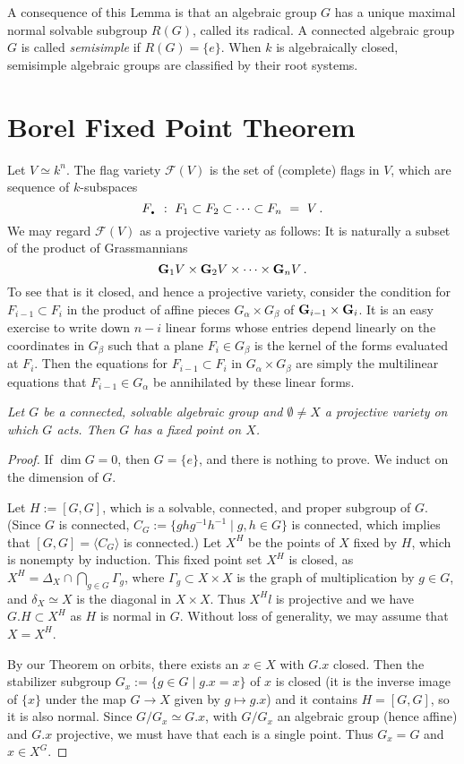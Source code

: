 \documentclass[12pt]{amsart}
\newcommand{\DOT}{{\mbox{\Large\bf .}}}
\newcommand{\G}{{\bf G}}
\begin{document}
A consequence of this Lemma is that an algebraic group $G$ has a unique maximal
normal solvable subgroup $R(G)$, called its radical.
A connected algebraic group $G$ is called {\sl semisimple} if $R(G)=\{e\}$.
When $k$ is algebraically closed, semisimple algebraic groups are classified
by their root systems.



\section{Borel Fixed Point Theorem}


Let $V\simeq k^n$.
The flag variety ${\mathcal F}(V)$ is
the set of 
(complete) flags in $V$, which are sequence of $k$-subspaces
$$
   F_{\DOT}\ :\ F_1\subset F_2\subset\cdots\subset F_n\ =\ V\,.
$$
We may regard ${\mathcal F}(V)$ as a projective variety as follows:
It is naturally a subset of the product of Grassmannians
$$
  {\bf G}_1V\times {\bf G}_2 V\times \cdots\times {\bf G}_nV\,.
$$
To see that is it closed, and hence a projective variety,
consider the condition for $F_{i-1}\subset F_i$ in
the product of affine pieces $G_{\alpha}\times G_\beta$ of 
$\G_{i-1}\times \G_i$.
It is an easy exercise to write down $n-i$ linear forms whose entries depend
linearly on the coordinates in $G_\beta$ such that a plane $F_i\in G_\beta$
is the kernel of the forms evaluated at $F_i$.
Then the equations for $F_{i-1}\subset F_i$ in $G_{\alpha}\times G_\beta$ 
are simply the multilinear equations that $F_{i-1}\in G_\alpha$
be annihilated by these linear forms.
\medskip


{\it 
Let $G$ be a connected, solvable algebraic group and $\emptyset\neq X$ a
projective variety on which $G$ acts.
Then $G$ has a fixed point on $X$.
}\medskip

\begin{proof}
If $\dim G=0$, then $G=\{e\}$, and there is nothing to prove.
We induct on the dimension of $G$.

Let $H:=[G,G]$, which is a solvable, connected, and proper subgroup of $G$.
(Since $G$ is connected, $C_G:=\{ghg^{-1}h^{-1}\mid g,h\in G\}$ is
connected, which 
implies that $[G,G]=\langle C_G \rangle$ is connected.)
Let $X^H$ be the points of $X$ fixed by $H$, which is nonempty by
induction.
This fixed point set $X^H$ is closed, as 
$X^H=\Delta_X \cap \bigcap_{g\in G} \Gamma_g$, where 
$\Gamma_g\subset X\times X$
is the graph of multiplication by $g\in G$, and $\delta_X\simeq X$
is the diagonal in $X\times X$.
Thus $X^Hl$ is projective and we have $G.H\subset X^H$ as $H$ is normal in
$G$. 
Without loss of generality, we may assume that $X=X^H$.


By our Theorem on orbits, there exists an $x\in X$ with $G.x$ closed.
Then the stabilizer subgroup $G_x:=\{g\in G\mid g.x=x\}$ of $x$ is closed
(it is the inverse image of $\{x\}$ under the map $G\to X$ given by 
$g\mapsto g.x$)
and it contains $H=[G,G]$, so it is also normal.
Since $G/G_x\simeq G.x$, with $G/G_x$ an algebraic group (hence affine) and 
$G.x$ projective, we must have that each is a single point.
Thus $G_x=G$ and $x\in X^G$.
\end{proof}
\end{document}
